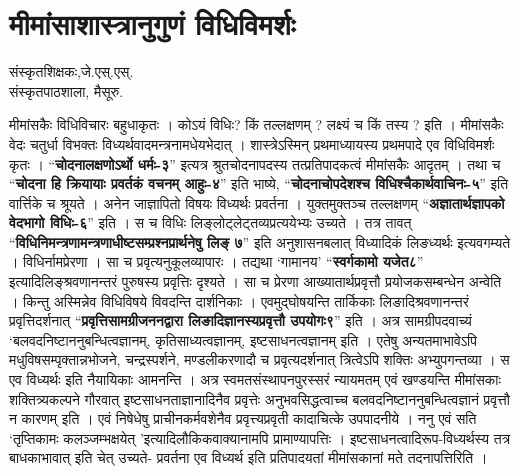 \chapter{मीमांसाशास्त्रानुगुणं विधिविमर्शः}

\begin{center}
\smallskip

संस्कृतशिक्षकः,जे.एस्.एस्.\\ 
संस्कृतपाठशाला, मैसूरु.
\end{center}

मीमांसकैः विधिविचारः बहुधाकृतः । कोऽयं विधिः? किं तल्लक्षणम् ? लक्ष्यं च किं तस्य ? इति । मीमांसकैः वेदः चतुर्धा विभक्तः विध्यर्थवादमन्त्रनामधेयभेदात् ।  शास्त्रेऽस्मिन् प्रथमाध्यायस्य प्रथमपादे एव विधिविमर्शः कृतः । “\textbf{चोदनालक्षणोऽर्थो धर्मः-३}” इत्यत्र श्रुतचोदनापदस्य तत्प्रतिपादकत्वं मीमांसकैः आदृतम् । तथा च “\textbf{चोदना हि क्रियायाः प्रवर्तकं वचनम् आहुः-४}”  इति भाष्ये, “\textbf{चोदनाचोपदेशश्च विधिश्चैकार्थवाचिनः-५}” इति वार्त्तिके च श्रूयते । अनेन जाज्ञापितो विषयः विध्यर्थः प्रवर्तना । युक्तमुक्तञ्च तल्लक्षणम् “\textbf{अज्ञातार्थज्ञापको वेदभागो विधिः-६}” इति । स च विधिः लिङ्लोट्लेट्तव्यप्रत्ययेभ्यः उच्यते । तत्र तावत् “\textbf{विधिनिमन्त्रणामन्त्रणाधीष्टसम्प्रश्नप्रार्थनेषु लिङ् ७}” इति अनुशासनबलात् विध्यादिकं लिङध्यर्थः इत्यवगम्यते । विधिर्नामप्रेरणा । सा च प्रवृत्यनुकूलव्यापारः । तद्यथा ‘गामानय’ “\textbf{स्वर्गकामो यजेत८}” इत्यादिलिङ्श्रवणानन्तरं पुरुषस्य प्रवृत्तिः दृश्यते । सा च प्रेरणा आख्यातार्थप्रवृत्तौ प्रयोजकसम्बन्धेन अन्वेति । किन्तु अस्मिन्नेव विधिविषये विवदन्ति दार्शनिकाः । एवमुद्घोषयन्ति तार्किकाः लिङादिश्रवणानन्तरं प्रवृत्तिदर्शनात् “\textbf{प्रवृत्तिसामग्रीजननद्वारा  लिङादिज्ञानस्यप्रवृत्तौ उपयोगः९}” इति । अत्र सामग्रीपदवाच्यं ‘बलवदनिष्टाननुबन्धित्वज्ञानम्, कृतिसाध्यत्वज्ञानम्, इष्टसाधनत्वज्ञानम् इति । एतेषु अन्यतमाभावेऽपि मधुविषसम्पृक्तान्नभोजने, चन्द्रस्पर्शने, मण्डलीकरणादौ च प्रवृत्यदर्शनात् त्रित्वेऽपि शक्तिः अभ्युपगन्तव्या । स एव विध्यर्थः इति नैयायिकाः आमनन्ति । अत्र स्वमतसंस्थापनपुरस्सरं न्यायमतम् एवं खण्डयन्ति मीमांसकाः शक्तित्र्यकल्पने गौरवात् इष्टसाधनताज्ञानादिनैव प्रवृत्तेः अनुभवसिद्धत्वाच्च बलवदनिष्टाननुबन्धित्वज्ञानं प्रवृत्तौ न कारणम् इति । एवं निषेधेषु प्राचीनकर्मवशेनैव प्रवृत्त्यप्रवृती कादाचित्के उपपादनीये । ननु एवं सति ‘तृप्तिकामः कलञ्जम्भक्षयेत् ’इत्यादिलौकिकवाक्यानामपि प्रामाण्यापत्तिः । इष्टसाधनत्वादिरूप-विध्यर्थस्य तत्र बाधकाभावात् इति चेत् उच्यते- प्रवर्तना एव विध्यर्थ इति प्रतिपादयतां मीमांसकानां मते तदनापत्तिरिति ।

